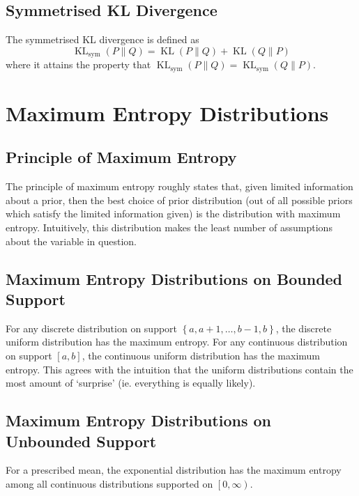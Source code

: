 \documentclass[11pt]{report} %
\begin{document}
\subsection{Symmetrised KL Divergence}

The symmetrised KL divergence is defined as
\begin{equation}
\operatorname{KL}_{\mathrm{sym}}\left(P\middle\|Q\right) = \operatorname{KL}\left(P\middle\|Q\right) + \operatorname{KL}\left(Q\middle\|P\right)
\end{equation}
where it attains the property that $\operatorname{KL}_{\mathrm{sym}}\left(P\middle\|Q\right) = \operatorname{KL}_{\mathrm{sym}}\left(Q\middle\|P\right)$.

\section{Maximum Entropy Distributions}

\subsection{Principle of Maximum Entropy}

The principle of maximum entropy roughly states that, given limited information about a prior, then the best choice of prior distribution (out of all possible priors which satisfy the limited information given) is the distribution with maximum entropy. Intuitively, this distribution makes the least number of assumptions about the variable in question.

\subsection{Maximum Entropy Distributions on Bounded Support}
For any discrete distribution on support $\left\{a, a + 1, \dots, b - 1, b\right\}$, the discrete uniform distribution has the maximum entropy. For any continuous distribution on support $\left[a, b\right]$, the continuous uniform distribution has the maximum entropy. This agrees with the intuition that the uniform distributions contain the most amount of `surprise' (ie. everything is equally likely).

\subsection{Maximum Entropy Distributions on Unbounded Support}

For a prescribed mean, the exponential distribution has the maximum entropy among all continuous distributions supported on $\left[0, \infty\right)$. \\
\end{document}
